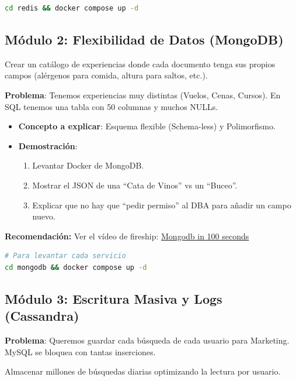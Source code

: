 \documentclass[12pt,a4paper]{article}
\begin{document}
\begin{lstlisting}[language=bash]
cd redis && docker compose up -d
\end{lstlisting}

\subsection{Módulo 2: Flexibilidad de Datos (MongoDB)}
\begin{objetivo}
Crear un catálogo de experiencias donde cada documento tenga sus propios campos (alérgenos para comida, altura para saltos, etc.).
\end{objetivo}
\textbf{Problema}: Tenemos experiencias muy distintas (Vuelos, Cenas, Cursos). En SQL tenemos una tabla con 50 columnas y muchos NULLs.

\begin{itemize}
    \item \textbf{Concepto a explicar}: Esquema flexible (Schema-less) y Polimorfismo.
    \item \textbf{Demostración}:
    \begin{enumerate}
        \item Levantar Docker de MongoDB.
        \item Mostrar el JSON de una \enquote{Cata de Vinos} vs un \enquote{Buceo}.
        \item Explicar que no hay que \enquote{pedir permiso} al DBA para añadir un campo nuevo.
    \end{enumerate}
\end{itemize}

\textbf{Recomendación: } Ver el vídeo de fireship: \href{https://www.youtube.com/watch?v=-bt_y4Loofg}{Mongodb in 100 seconds}

\begin{lstlisting}[language=bash]
# Para levantar cada servicio
cd mongodb && docker compose up -d
\end{lstlisting}

\subsection{Módulo 3: Escritura Masiva y Logs (Cassandra)}

\textbf{Problema}: Queremos guardar cada búsqueda de cada usuario para Marketing. MySQL se bloquea con tantas inserciones.

\begin{objetivo}
Almacenar millones de búsquedas diarias optimizando la lectura por usuario.
\end{objetivo}
\end{document}
